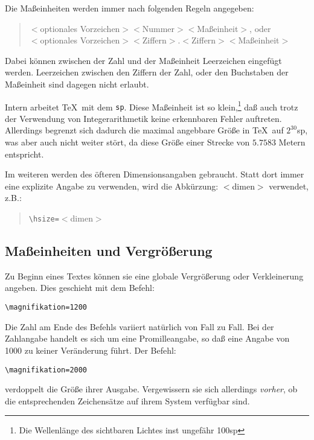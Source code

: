 Die Ma\ss{}einheiten werden immer nach folgenden Regeln angegeben:
\begin{quote}
$<$optionales Vorzeichen$><$Nummer$><$Ma\ss{}einheit$>$, oder\\
$<$optionales Vorzeichen$><$Ziffern$>.<$Ziffern$><$Ma\ss{}einheit$>$
\end{quote}
Dabei k\"onnen zwischen der Zahl und der Ma\ss{}einheit 
Leerzeichen
eingef\"ugt werden. Leerzeichen zwischen den 
Ziffern der Zahl, oder den
Buchstaben der Ma\ss{}einheit sind dagegen nicht erlaubt.

Intern arbeitet \TeX\ mit dem {\tt sp}. Diese Ma\ss{}einheit ist so
klein,\footnote{Die Wellenl\"ange des sichtbaren Lichtes inst ungef\"ahr
100sp} da\ss{} auch trotz der Verwendung von 
Integerarithmetik keine
erkennbaren 
Fehler auftreten. Allerdings begrenzt sich dadurch die
maximal angebbare Gr\"o\ss{}e in \TeX\ auf $2^{30}$sp, was aber auch nicht
weiter st\"ort, da diese Gr\"o\ss{}e einer Strecke von $5.7583$ Metern
entspricht.

Im weiteren werden des \"ofteren 
Dimensionsangaben gebraucht. Statt
dort immer eine explizite Angabe zu verwenden, wird die
Abk\"urzung:
$<$dimen$>$ verwendet, z.B.:
\begin{quote}
\verb|\hsize=|$<$dimen$>$
\end{quote}
\subsection{Ma\ss{}einheiten und Vergr\"o\ss{}erung}
Zu Beginn eines Textes k\"onnen sie eine
globale Vergr\"o\ss{}erung oder
Verkleinerung angeben. Dies geschieht mit dem Befehl:
\begin{verbatim}
\magnifikation=1200
\end{verbatim}
Die Zahl am Ende des Befehls variiert nat\"urlich von Fall zu Fall. Bei
der Zahlangabe handelt es sich um eine 
Promilleangabe, so da\ss{} eine
Angabe von 1000 zu keiner Ver\"anderung f\"uhrt. Der Befehl:
\begin{verbatim}
\magnifikation=2000
\end{verbatim}
verdoppelt die Gr\"o\ss{}e ihrer 
Ausgabe. Vergewissern sie sich allerdings {\em
vorher}, ob die entsprechenden Zeichens\"atze auf ihrem System verf\"ugbar
sind.

